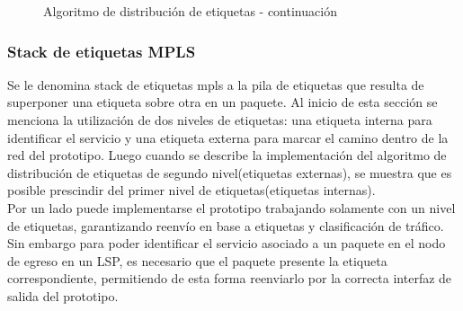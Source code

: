 \newpage
\begin{figure}[ht!]
\begin{algorithm}[H]
\end{algorithm}
\caption[]{Algoritmo de distribución de etiquetas - continuación}
\end{figure}

\subsubsection{Stack de etiquetas MPLS}
Se le denomina stack de etiquetas mpls a la pila de etiquetas que resulta de superponer una etiqueta sobre otra en un paquete. Al inicio de esta secci\'on se menciona la utilizaci\'on de dos niveles de etiquetas: una etiqueta interna para identificar el servicio y una etiqueta externa para marcar el camino dentro de la red del prototipo. Luego cuando se describe la implementaci\'on del algoritmo de distribución de etiquetas de segundo nivel(etiquetas externas), se muestra que es posible prescindir del primer nivel de etiquetas(etiquetas internas).\\

Por un lado puede implementarse el prototipo trabajando solamente con un nivel de etiquetas, garantizando reenvío en base a etiquetas y clasificaci\'on de tr\'afico. Sin embargo para poder identificar el servicio asociado a un paquete en el nodo de egreso en un LSP, es necesario que el paquete presente la etiqueta correspondiente, permitiendo de esta forma reenviarlo por la correcta interfaz de salida del prototipo. 

